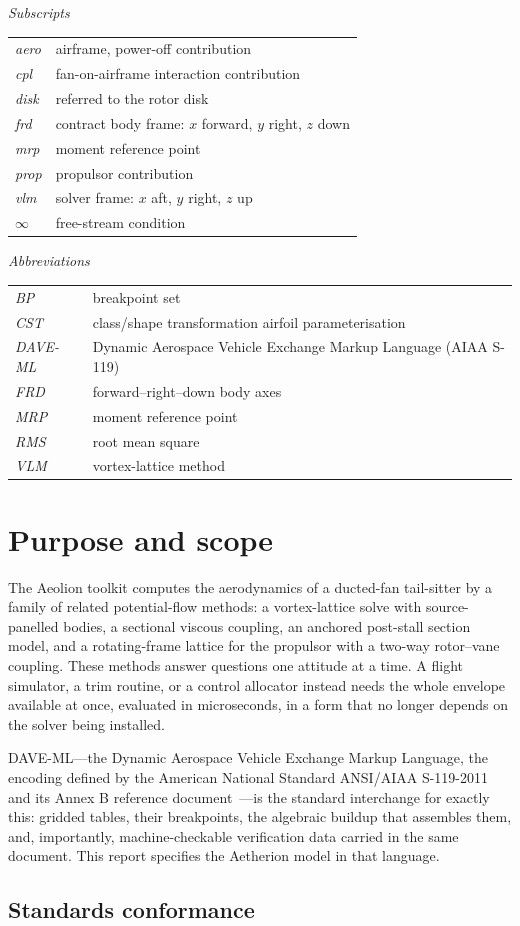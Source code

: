 \documentclass[11pt,a4paper]{article}
\newcommand{\nomen}[2]{\textit{#1} & \quad #2 \\}
\begin{document}
\noindent\textit{Subscripts}
\begin{longtable}{@{}p{28mm}@{}p{112mm}@{}}
\nomen{aero}{airframe, power-off contribution}
\nomen{cpl}{fan-on-airframe interaction contribution}
\nomen{disk}{referred to the rotor disk}
\nomen{frd}{contract body frame: $x$ forward, $y$ right, $z$ down}
\nomen{mrp}{moment reference point}
\nomen{prop}{propulsor contribution}
\nomen{vlm}{solver frame: $x$ aft, $y$ right, $z$ up}
\nomen{$\infty$}{free-stream condition}
\end{longtable}

\noindent\textit{Abbreviations}
\begin{longtable}{@{}p{28mm}@{}p{112mm}@{}}
\nomen{BP}{breakpoint set}
\nomen{CST}{class/shape transformation airfoil parameterisation}
\nomen{DAVE-ML}{Dynamic Aerospace Vehicle Exchange Markup Language (AIAA S-119)}
\nomen{FRD}{forward--right--down body axes}
\nomen{MRP}{moment reference point}
\nomen{RMS}{root mean square}
\nomen{VLM}{vortex-lattice method}
\end{longtable}

\section{Purpose and scope}

The Aeolion toolkit computes the aerodynamics of a ducted-fan tail-sitter
by a family of related potential-flow methods: a vortex-lattice solve
with source-panelled bodies, a sectional viscous coupling, an anchored
post-stall section model, and a rotating-frame lattice for the propulsor
with a two-way rotor--vane coupling. These methods answer questions one
attitude at a time. A flight simulator, a trim routine, or a control
allocator instead needs the whole envelope available at once, evaluated
in microseconds, in a form that no longer depends on the solver being
installed.

DAVE-ML---the Dynamic Aerospace Vehicle Exchange Markup Language, the
encoding defined by the American National Standard ANSI/AIAA
S-119-2011~\cite{s119} and its Annex B reference
document~\cite{davemlref}---is the standard interchange for exactly this:
gridded tables, their breakpoints, the algebraic buildup that assembles
them, and, importantly, machine-checkable verification data carried in
the same document. This report specifies the Aetherion model in that
language.

\subsection{Standards conformance}
\label{sec:standards}
\end{document}
